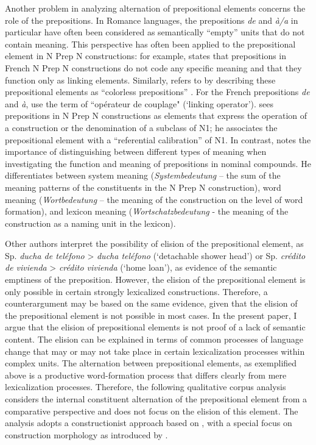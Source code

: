 \documentclass[output=paper]{langsci/langscibook}
\begin{document}
Another problem in analyzing alternation of prepositional elements concerns the role of the prepositions. In Romance languages, the prepositions \textit{de} and \textit{à/a} in particular have often been considered as semantically ``empty'' units that do not contain meaning. This perspective has often been applied to the prepositional element in N Prep N constructions: for example, \citet[164]{Bartning:1993} states that prepositions in French N Prep N constructions do not code any specific meaning and that they function only as linking elements. Similarly, \citet{Bartning:1993} refers to \citet{Cadiot:1997} by describing these prepositional elements as ``colorless prepositions'' \citep[164]{Bartning:1993}. For the French prepositions \textit{de} and \textit{à}, \citet[44]{Bosredon:1991} use the term of ``opérateur de couplage" (`linking operator'). \citet{Cadiot:1997} sees prepositions in N Prep N constructions as elements that express the operation of a construction or the denomination of a subclass of N1; he associates the prepositional element with a ``referential calibration'' of N1. In contrast, \citet[32]{Laumann:1998} notes the importance of distinguishing between different types of meaning when investigating the function and meaning of prepositions in nominal compounds. He differentiates between system meaning (\textit{Systembedeutung} -- the sum of the meaning patterns of the constituents in the N Prep N construction), word meaning (\textit{Wortbedeutung} -- the meaning of the construction on the level of word formation), and lexicon meaning (\textit{Wortschatzbedeutung} - the meaning of the construction as a naming unit in the lexicon).

Other authors interpret the possibility of elision of the prepositional element, as Sp. \textit{ducha de teléfono}  > \textit{ducha teléfono} (`detachable shower head') or Sp.  \textit{crédito de vivienda} > \textit{crédito  vivienda} (`home loan'), as evidence of the semantic emptiness of the preposition. However, the elision of the prepositional element is only possible in certain strongly lexicalized constructions. Therefore, a counterargument may be based on the same evidence, given that the elision of the prepositional element is not possible in most cases. In the present paper, I argue that the elision of prepositional elements is not proof of a lack of semantic content. The elision can be explained in terms of common processes of language change that may or may not take place in certain lexicalization processes within complex units. The alternation between prepositional elements, as exemplified above is a productive word-formation process that differs clearly from mere lexicalization processes. Therefore, the following qualitative corpus analysis considers the internal constituent alternation of the prepositional element from a comparative perspective and does not focus on the elision of this element. The analysis adopts a constructionist approach based on \citet{Goldberg:1995,Goldberg:2006}, with a special focus on construction morphology as introduced by \citet{Booij:2010,Booij:2015}.
\end{document}
